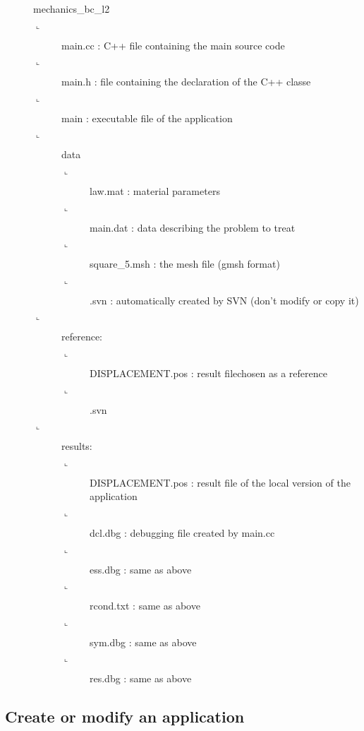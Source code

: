 \begin{description}
\item[] mechanics\_bc\_l2
   \begin{description}
	\item[$\llcorner$]main.cc  : C++ file containing the main source code
	\item[$\llcorner$]main.h : file containing the declaration of the C++ classe
	\item[$\llcorner$]main : executable file of the application
	\item[$\llcorner$]data
		\begin{description}
		\item[$\llcorner$] law.mat : material parameters
		\item[$\llcorner$] main.dat : data describing the problem to treat
		\item[$\llcorner$] square\_5.msh : the mesh file (gmsh format)
		\item[$\llcorner$] .svn : automatically created by SVN (don't modify or copy it)
		\end{description}  
	\item[$\llcorner$]reference:
		\begin{description}
		\item[$\llcorner$] DISPLACEMENT.pos : result filechosen as a reference
		\item[$\llcorner$] .svn
		\end{description}  
	\item[$\llcorner$]results:
		\begin{description}
		\item[$\llcorner$] DISPLACEMENT.pos : result file of the local version of the application
		\item[$\llcorner$] dcl.dbg : debugging file created by main.cc
		\item[$\llcorner$] ess.dbg : same as above 
		\item[$\llcorner$] rcond.txt  : same as above 
		\item[$\llcorner$] sym.dbg : same as above 
		\item[$\llcorner$] res.dbg : same as above 
		\end{description}  
   \end{description}
\end{description}







\subsection{Create or modify an application}

